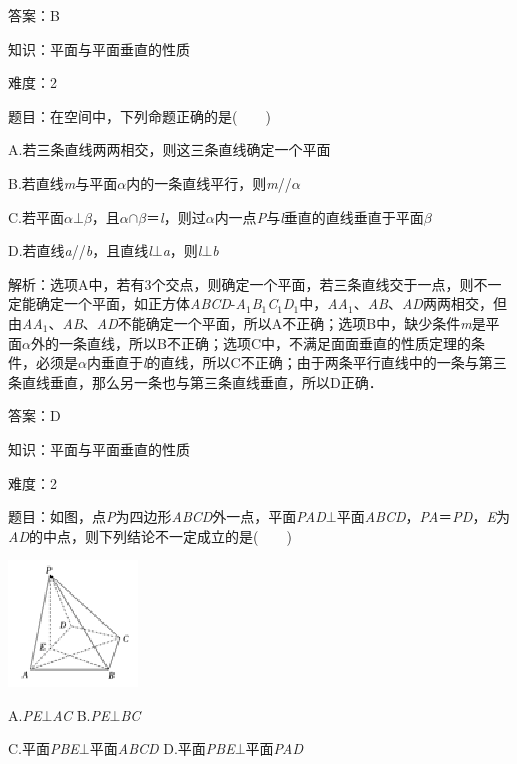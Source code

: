 \documentclass{article} %
\begin{document}
答案：B

知识：平面与平面垂直的性质

难度：2

题目：在空间中，下列命题正确的是(　　)

A.若三条直线两两相交，则这三条直线确定一个平面

B.若直线\textit{m}与平面\textit{$\alpha$}内的一条直线平行，则\textit{m}//\textit{$\alpha$}

C.若平面\textit{$\alpha$}$\mathrm{\bot}$\textit{$\beta$}，且\textit{$\alpha$}$\mathrm{\cap}$\textit{$\beta$}＝\textit{l}，则过\textit{$\alpha$}内一点\textit{P}与\textit{l}垂直的直线垂直于平面\textit{$\beta$}

D.若直线\textit{a}//\textit{b}，且直线\textit{l}$\mathrm{\bot}$\textit{a}，则\textit{l}$\mathrm{\bot}$\textit{b}

解析：选项A中，若有3个交点，则确定一个平面，若三条直线交于一点，则不一定能确定一个平面，如正方体\textit{ABCD}-\textit{A}${}_{1}$\textit{B}${}_{1}$\textit{C}${}_{1}$\textit{D}${}_{1}$中，\textit{AA}${}_{1}$、\textit{AB}、\textit{AD}两两相交，但由\textit{AA}${}_{1}$、\textit{AB}、\textit{AD}不能确定一个平面，所以A不正确；选项B中，缺少条件\textit{m}是平面\textit{$\alpha$}外的一条直线，所以B不正确；选项C中，不满足面面垂直的性质定理的条件，必须是\textit{$\alpha$}内垂直于\textit{l}的直线，所以C不正确；由于两条平行直线中的一条与第三条直线垂直，那么另一条也与第三条直线垂直，所以D正确．

答案：D

知识：平面与平面垂直的性质

难度：2

题目：如图，点\textit{P}为四边形\textit{ABCD}外一点，平面\textit{PAD}$\mathrm{\bot}$平面\textit{ABCD}，\textit{PA}＝\textit{PD}，\textit{E}为\textit{AD}的中点，则下列结论不一定成立的是(　　)

\includegraphics*[width=1.36in, height=1.32in, keepaspectratio=false]{image255}

A.\textit{PE}$\mathrm{\bot}$\textit{AC  }B.\textit{PE}$\mathrm{\bot}$\textit{BC}

C.平面\textit{PBE}$\mathrm{\bot}$平面\textit{ABCD }D.平面\textit{PBE}$\mathrm{\bot}$平面\textit{PAD}
\end{document}
